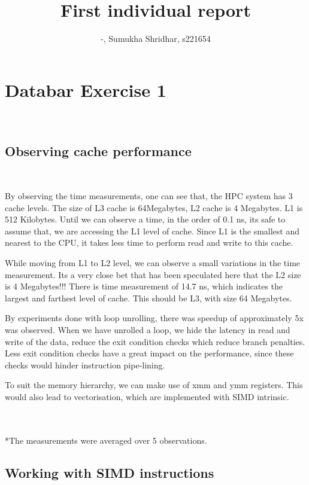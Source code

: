 \documentclass[acmlarge,screen,nonacm]{acmart}
\begin{document}
\title{First individual report}

\author{-, Sumukha Shridhar, s221654}

\maketitle

\section{Databar Exercise 1} \

\subsection{Observing cache performance} \

By observing the time measurements, one can see that, the HPC system has 3 cache levels. The size of L3 cache is 64Megabytes, L2 cache is 4 Megabytes. L1 is 512 Kilobytes.
Until we can observe a time, in the order of 0.1 ns, its safe to assume that, we are accessing the L1 level of cache. Since L1 is the smallest and nearest to the CPU, it takes less time to perform read and write to this cache. \

While moving from L1 to L2 level, we can observe a small variations in the time measurement. Its a very close bet that has been speculated here that the L2 size is 4 Megabytes!!! There is time measurement of 14.7 ns, which indicates the largest and farthest level of cache. This should be L3, with size 64 Megabytes. \

By experiments done with loop unrolling, there was speedup of approximately 5x was observed. When we have unrolled a loop, we hide the latency in read and write of the data, reduce the exit condition checks which reduce branch penalties. Less exit condition checks have a great impact on the performance, since these checks would hinder instruction pipe-lining. \

To suit the memory hierarchy, we can make use of xmm and ymm registers. This would also lead to vectorisation, which are implemented with SIMD intrinsic. \

\\~\\
*The measurements were averaged over 5 observations.


\subsection{Working with SIMD instructions} \
\end{document}
